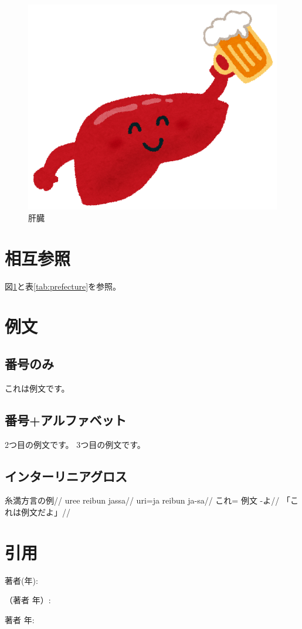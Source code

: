 \documentclass[xelatex,a4paper,base=11pt,twoside,ja=standard]{bxjsarticle}
\begin{document}
\begin{figure}[h]
\centering
\includegraphics[width=50truemm]{liver.png}
\caption{肝臓}
\label{fig:liver}
\end{figure}

\section{相互参照}
図\ref{fig:liver}と表\ref{tab:prefecture}を参照。

\section{例文}
\subsection{番号のみ}
\ex
これは例文です。
\xe

\subsection{番号+アルファベット}
\pex
\a 2つ目の例文です。
\a 3つ目の例文です。
\xe

\subsection{インターリニアグロス}
\ex
\begingl
\glpreamble 糸満方言の例//
\gla uree reibun jassa//
\glb uri=ja reibun ja-sa//
\glc これ=\Top{} 例文 \Cop{}-よ//
\glft 「これは例文だよ」//
\endgl
\xe

\section{引用}
著者(年): \citet[89]{kiparsky1968}

（著者 年）: \citep[100]{paul1978}

著者 年: \citealp[10]{shibatani1978}

\printglossaries


\end{document}

